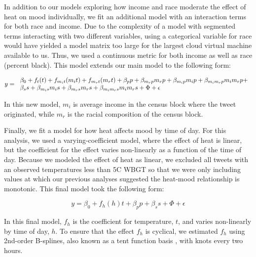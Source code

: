 \documentclass[fleqn,10pt]{wlscirep}
\begin{document}
In addition to our models exploring how income and race moderate the effect of heat on mood individually, we fit an additional model with an interaction terms for both race and income. Due to the complexity of a model with segmented terms interacting with two different variables, using a categorical variable for race would have yielded a model matrix too large for the largest cloud virtual machine available to us. Thus, we used a continuous metric for both income as well as race (percent black). This model extends our main model to the following form:

\begin{equation}
 y = \begin{tabular}{l}
 $\beta_0 + f_t(t) + f_{m_{i}t}(m_{i} t) + f_{m_{r}t}(m_{r} t) + 
 \beta_p p + \beta_{m_{r} p} m_{r} p + 
 \beta_{m_{i} p} m_{i} p + \beta_{m_{i} m_{r} p} m_{i} m_{r} p + $
 \\
 $\beta_s s + \beta_{m_{i} s} m_{i} s + 
 \beta_{m_{r} s} m_{r} s + \beta_{m_{i} m_{r} s} m_{i} m_{r} s + 
 \Phi + \epsilon$
 \end{tabular}
 \label{mod:race-inc}
\end{equation}

In this new model, $m_{i}$ is average income in the census block where the tweet originated, while $m_{r}$ is the racial composition of the census block.

Finally, we fit a model for how heat affects mood by time of day. For this analysis, we used a varying-coefficient model, where the effect of heat is linear, but the coefficient for the effect varies non-linearly as a function of the time of day. Because we modeled the effect of heat as linear, we excluded all tweets with an observed temperatures less than 5\textdegree C WBGT so that we were only including values at which our previous analyses suggested the heat-mood relationship is monotonic. This final model took the following form:

\begin{equation}
 y = \beta_0 + f_h(h)t + \beta_p p + \beta_s s + \Phi + \epsilon
 \label{mod:tod}
\end{equation}

In this final model, $f_{h}$ is the coefficient for temperature, $t$, and varies non-linearly by time of day, $h$. To ensure that the effect $f_{h}$ is cyclical, we estimated $f_{h}$ using 2nd-order B-splines, also known as a tent function basis \cite[Chapter~4.2]{wood2017generalized}, with knots every two hours.
\end{document}
